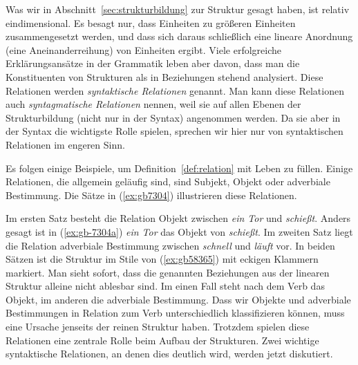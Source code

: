 Was wir in Abschnitt~\ref{sec:strukturbildung} zur Struktur gesagt haben, ist relativ eindimensional.
Es besagt nur, dass Einheiten zu größeren Einheiten zusammengesetzt werden, und dass sich daraus schließlich eine lineare Anordnung (eine Aneinanderreihung) von Einheiten ergibt.
Viele erfolgreiche Erklärungsansätze in der Grammatik leben aber davon, dass man die Konstituenten von Strukturen als in Beziehungen stehend analysiert.
Diese Relationen werden \textit{syntaktische Relationen} genannt.
Man kann diese Relationen auch \textit{syntagmatische Relationen} nennen, weil sie auf allen Ebenen der Strukturbildung (nicht nur in der Syntax) angenommen werden.
Da sie aber in der Syntax die wichtigste Rolle spielen, sprechen wir hier nur von syntaktischen Relationen im engeren Sinn.


Es folgen einige Beispiele, um Definition~\ref{def:relation} mit Leben zu füllen.
Einige Relationen, die allgemein geläufig sind, sind Subjekt, Objekt oder adverbiale Bestimmung.
Die Sätze in (\ref{ex:gb7304}) illustrieren diese Relationen.

\begin{exe}
  \ex\label{ex:gb7304}
  \begin{xlist}
  \end{xlist}
\end{exe}

Im ersten Satz besteht die Relation Objekt zwischen \textit{ein Tor} und \textit{schießt}.
Anders gesagt ist in (\ref{ex:gb-7304a}) \textit{ein Tor} das Objekt von \textit{schießt}.
Im zweiten Satz liegt die Relation adverbiale Bestimmung zwischen \textit{schnell} und \textit{läuft} vor.
In beiden Sätzen ist die Struktur im Stile von (\ref{ex:gb58365}) mit eckigen Klammern markiert.
Man sieht sofort, dass die genannten Beziehungen aus der linearen Struktur alleine nicht ablesbar sind.
Im einen Fall steht nach dem Verb das Objekt, im anderen die adverbiale Bestimmung.
Dass wir Objekte und adverbiale Bestimmungen in Relation zum Verb unterschiedlich klassifizieren können, muss eine Ursache jenseits der reinen Struktur haben.
Trotzdem spielen diese Relationen eine zentrale Rolle beim Aufbau der Strukturen.
Zwei wichtige syntaktische Relationen, an denen dies deutlich wird, werden jetzt diskutiert.

